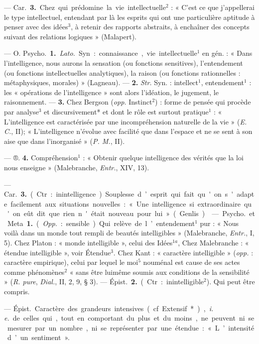 \begin{itemize}[leftmargin=1cm, label=, itemsep=1pt]
— \si{Car.} {\bf 3.} Chez qui prédomine la
vie intellectuelle$^2$ : « C'est ce que
j'appellerai le type intellectuel, entendant par là les esprits qui ont une
particulière aptitude à penser avec des
idées$^3$, à retenir des rapports abstraits,
à enchaîner des concepts suivant
des relations logiques » (Malapert).

 — O. \si{Psycho.} {\bf 1.} {\it Lato.}
Syn. : connaissance, vie intellectuelle$^1$ en gén. : « Dans l'intelligence,
nous aurons la sensation (ou fonctions sensitives), l’entendement (ou
fonctions intellectuelles analytiques),
la raison (ou fonctions rationnelles :
métaphysiques, morales) » (Lagneau). — {\bf 2.} {\it Str.} Syn. : intellect$^1$,
entendement$^1$ : les « opérations de
l'intelligence » sont alors l’idéation,
le jugement, le raisonnement. —
 {\bf 3.} Chez Bergson ({\it opp.} Instinct$^2$) :
forme de pensée qui procède par
analyse$^3$ et discursivement* et dont
le rôle est surtout pratique$^1$ : « L’intelligence est caractérisée par une
incompréhension naturelle de la
vie » ({\it E. C.}, II); « L'intelligence
n’évolue avec facilité que dans
l’espace et ne se sent à son aise que
dans l'inorganisé » ({\it P. M.}, II).

— ®. {\bf 4.} Compréhension$^1$ : « Obtenir quelque intelligence des vérités
que la loi nous enseigne » (Malebranche, {\it Entr.}, {\footnotesize XIV}, 13).

— \si{Car.} {\bf 3.} (Ctr. : inintelligence).
Souplesse d’esprit qui fait qu'on
s'adapte facilement aux situations
nouvelles : « ... Une intelligence si
extraordinaire qu'on eût dit que
rien n'était nouveau pour lui »
(Genlis).

 — \si{Psycho.} et Meta. {\bf 1.}
({\it Opp.} : sensible). Qui relève de l’entendement$^1$ pur : « Nous voilà dans
un monde tout rempli de beautés
intelligibles » (Malebranche, {\it Entr.},
I, 5). Chez Platon : « monde intelligible », celui des Idées$^{1a}$, Chez Malebranche : « étendue intelligible »,
voir Étendue$^3$. Chez Kant : « caractère intelligible » ({\it opp.} : caractère
empirique), celui par lequel le moi$^5$
nouménal est cause de ses actes
comme phénomènes$^2$ « sans être luimême soumis aux conditions de la
sensibilité » ({\it R. pure}, {\it Dial.}, II, 2,
9, § 3). — \si{Épist.} {\bf 2.} (Ctr. : inintelligible$^2$). Qui peut être compris.

 — \si{Épist.} Caractère des
grandeurs intensives (cf. Extensif*),
{\it i. e.} de celles qui, tout en comportant du plus et du moins, ne peuvent ni se mesurer par un nombre,
ni se représenter par une étendue :
« L’intensité d’un sentiment ».


\end{itemize}
